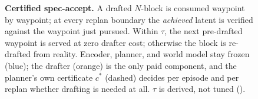 \begin{figure}[t]
{%
}
\caption{\textbf{Certified spec-accept.} A drafted $N$-block is consumed waypoint by
waypoint; at every replan boundary the \emph{achieved} latent is verified against
the waypoint just pursued. Within $\tau$, the next pre-drafted waypoint is served
at zero drafter cost; otherwise the block is re-drafted from reality. Encoder,
planner, and world model stay frozen (blue); the drafter (orange) is the only paid
component, and the planner's own certificate $c^{*}$ (dashed) decides per episode
and per replan whether drafting is needed at all. $\tau$ is derived, not tuned
().}
\label{fig:method}
\end{figure}
